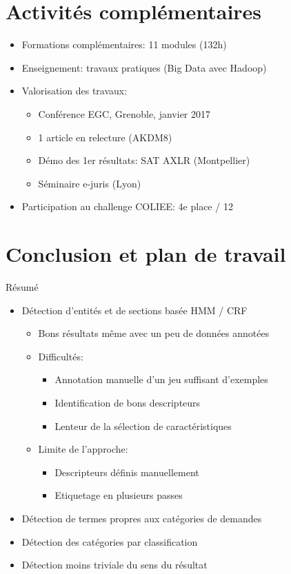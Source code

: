 \documentclass[newPxFont,pagenumber]{beamer}
\makeatletter
\newcommand*{\currentname}{\@currentlabelname}
\makeatother
\begin{document}
\section{Activités complémentaires}
\begin{frame}{\currentname}
\begin{itemize}
\setlength\itemsep{1em}
\item Formations complémentaires: 11 modules (132h)
\item Enseignement: travaux pratiques (Big Data avec Hadoop)
\item Valorisation des travaux: 
\begin{itemize}
\item Conférence EGC, Grenoble, janvier 2017
\item 1 article en relecture (AKDM8)
\item Démo des 1er résultats: SAT AXLR (Montpellier)
\item Séminaire e-juris (Lyon)
\end{itemize}
\item Participation au challenge COLIEE: 4e place / 12
\end{itemize}
\end{frame}

\section{Conclusion et plan de travail}

\begin{frame}{Résumé}
\begin{itemize}
\item Détection d'entités et de sections basée HMM / CRF
\begin{itemize}
\item Bons résultats même avec un peu de données annotées
\item Difficultés:
\begin{itemize}
\item Annotation manuelle d'un jeu suffisant d'exemples
\item Identification de bons descripteurs 
\item Lenteur de la sélection de caractéristiques
\end{itemize}
\item Limite de l'approche:
\begin{itemize}
\item Descripteurs définis manuellement 
\item Etiquetage en plusieurs passes 
\end{itemize}
\end{itemize}
\item Détection de termes propres aux catégories de demandes
\item Détection des catégories par classification
\item Détection moins triviale du sens du résultat 
\end{itemize}

\end{frame}
\end{document}
